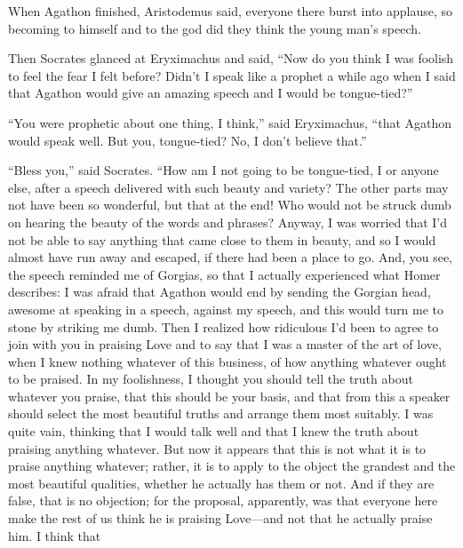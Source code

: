 When Agathon finished, Aristodemus said, everyone there burst into
applause, so becoming to himself and to the god did they think the young
man's speech.

Then Socrates glanced at Eryximachus and said, “Now do you think I was
foolish to feel the fear I felt before? Didn't I speak like a prophet a
while ago when I said that Agathon would give an amazing speech and I
would be tongue-tied?”

“You were prophetic about one thing, I think,” said Eryximachus, “that
Agathon would speak well. But you, tongue-tied? No, I don't believe
that.” 

“Bless you,” said Socrates. “How am I not going to be tongue-tied, I or
anyone else, after a speech delivered with such beauty and variety? The
other parts may not have been so wonderful, but that at the end! Who
would not be struck dumb on hearing the beauty of the words and phrases?
Anyway, I was worried that I'd not be able to say anything that came
close to them in beauty, and so I would almost have run away and
escaped,  if there had been a place to go. And, you see, the
speech reminded me of Gorgias, so that I actually experienced what Homer
describes: I was afraid that Agathon would end by sending the Gorgian
head,
awesome at
speaking in a speech, against my speech, and this would turn me to stone
by striking me dumb. Then I realized how ridiculous I'd been to agree to
join  with you in praising Love and to say that I was a master of
the art of love, when I knew nothing whatever of this business, of how
anything whatever ought to be praised. In my foolishness, I thought you
should tell the truth about whatever you praise, that this should be
your basis, and that from this a speaker should select the most
beautiful truths and arrange them most suitably. I was quite vain,
thinking that I would talk well and that I knew the truth about praising
anything whatever. But now it appears that this is not what it is to
praise anything whatever; rather, it is to apply  to the object
the grandest and the most beautiful qualities, whether he actually has
them or not. And if they are false, that is no objection; for the
proposal, apparently, was that everyone here make the rest of us think
he is praising Love---and not that he actually praise him. I think that
